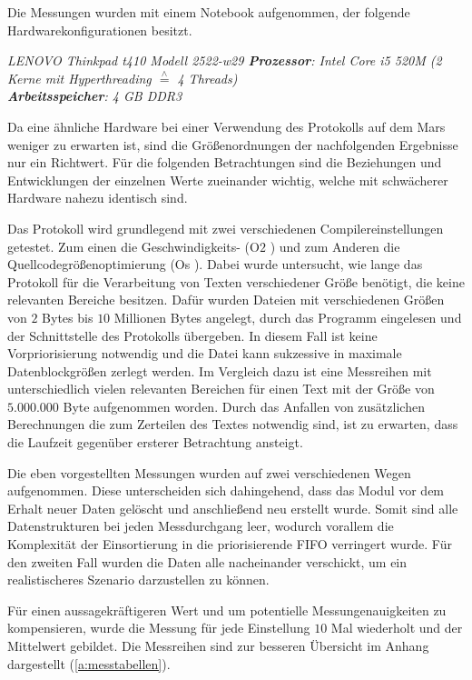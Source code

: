 \label{subCap:Messreihen}

Die Messungen wurden mit einem Notebook aufgenommen, der
folgende Hardwarekonfigurationen besitzt.

\textit{
	LENOVO Thinkpad t410 Modell 2522-w29 \newline
	\textbf{Prozessor}: Intel Core i5 520M (2 Kerne mit Hyperthreading $\stackrel{\wedge}=$ 4 Threads)\\
	\textbf{Arbeitsspeicher}: 4 GB DDR3	
	}

Da eine ähnliche Hardware bei einer Verwendung des Protokolls auf dem Mars
weniger zu erwarten ist, sind die Größenordnungen der nachfolgenden Ergebnisse
nur ein Richtwert. Für die folgenden Betrachtungen sind die Beziehungen und
Entwicklungen der einzelnen Werte zueinander wichtig, welche mit schwächerer
Hardware nahezu identisch sind.

Das Protokoll wird grundlegend mit zwei verschiedenen
Compilereinstellungen getestet. Zum einen die Geschwindigkeits- (\glqq O$2$
\grqq) und zum Anderen die Quellcodegrößenoptimierung (\glqq Os \grqq). Dabei
wurde untersucht, wie lange das Protokoll für die Verarbeitung von Texten
verschiedener Größe benötigt, die keine relevanten Bereiche besitzen. Dafür
wurden Dateien mit verschiedenen Größen von $2$ Bytes bis $10$ Millionen Bytes 
angelegt, durch das Programm eingelesen und der Schnittstelle des Protokolls
übergeben. In diesem Fall ist keine Vorpriorisierung notwendig und die Datei
kann sukzessive in maximale Datenblockgrößen zerlegt werden.
Im Vergleich dazu ist eine Messreihen mit unterschiedlich vielen relevanten
Bereichen für einen Text mit der Größe von $5.000.000$ Byte aufgenommen
worden.
Durch das Anfallen von zusätzlichen Berechnungen die zum Zerteilen 
des Textes notwendig sind, ist zu erwarten, dass die Laufzeit gegenüber
ersterer Betrachtung ansteigt.

Die eben vorgestellten Messungen wurden auf zwei verschiedenen Wegen
aufgenommen. Diese unterscheiden sich dahingehend, dass das Modul vor dem Erhalt
neuer Daten gelöscht und anschließend neu erstellt wurde. Somit sind alle
Datenstrukturen bei jeden Messdurchgang leer, wodurch vorallem die Komplexität
der Einsortierung in die priorisierende \gls{FIFO} verringert wurde. Für den
zweiten Fall wurden die Daten alle nacheinander verschickt, um ein realistischeres
Szenario darzustellen zu können.

Für einen aussagekräftigeren Wert und um potentielle Messungenauigkeiten zu
kompensieren, wurde die Messung für jede Einstellung $10$ Mal wiederholt und der
Mittelwert gebildet. Die Messreihen sind zur besseren Übersicht im
Anhang dargestellt (\ref{a:messtabellen}).